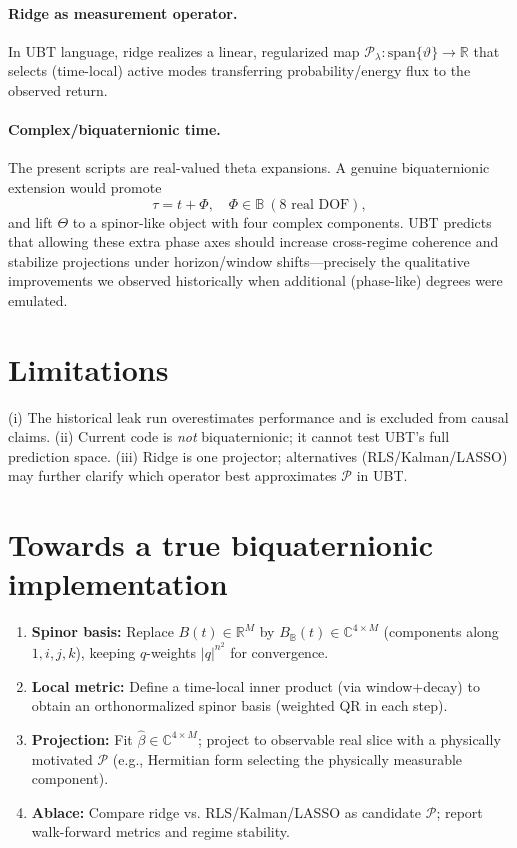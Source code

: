 \documentclass[11pt,a4paper]{article}
\begin{document}
\paragraph{Ridge as measurement operator.}
In UBT language, ridge realizes a linear, regularized map $\mathcal{P}_\lambda:\mathrm{span}\{\vartheta\}\to\mathbb{R}$ that selects (time-local) active modes transferring probability/energy flux to the observed return.

\paragraph{Complex/biquaternionic time.}
The present scripts are real-valued theta expansions. A genuine biquaternionic extension would promote
\[
\tau = t + \Phi,\quad \Phi\in\mathbb{B}\ (\text{8 real DOF}),
\]
and lift $\Theta$ to a spinor-like object with four complex components. UBT predicts that allowing these extra phase axes should increase cross-regime coherence and stabilize projections under horizon/wind\-ow shifts---precisely the qualitative improvements we observed historically when additional (phase-like) degrees were emulated.

\section{Limitations}
(i) The historical leak run overestimates performance and is excluded from causal claims. (ii) Current code is \emph{not} biquaternionic; it cannot test UBT's full prediction space. (iii) Ridge is one projector; alternatives (RLS/Kalman/LASSO) may further clarify which operator best approximates $\mathcal{P}$ in UBT.

\section{Towards a true biquaternionic implementation}
\begin{enumerate}
\item \textbf{Spinor basis:} Replace $B(t)\in\mathbb{R}^M$ by $B_\mathbb{B}(t)\in\mathbb{C}^{4\times M}$ (components along $1,i,j,k$), keeping $q$-weights $|q|^{n^2}$ for convergence.
\item \textbf{Local metric:} Define a time-local inner product (via window+decay) to obtain an orthonormalized spinor basis (weighted QR in each step).
\item \textbf{Projection:} Fit $\hat{\beta}\in\mathbb{C}^{4\times M}$; project to observable real slice with a physically motivated $\mathcal{P}$ (e.g., Hermitian form selecting the physically measurable component).
\item \textbf{Ablace:} Compare ridge vs. RLS/Kalman/LASSO as candidate $\mathcal{P}$; report walk-forward metrics and regime stability.
\end{enumerate}
\end{document}

